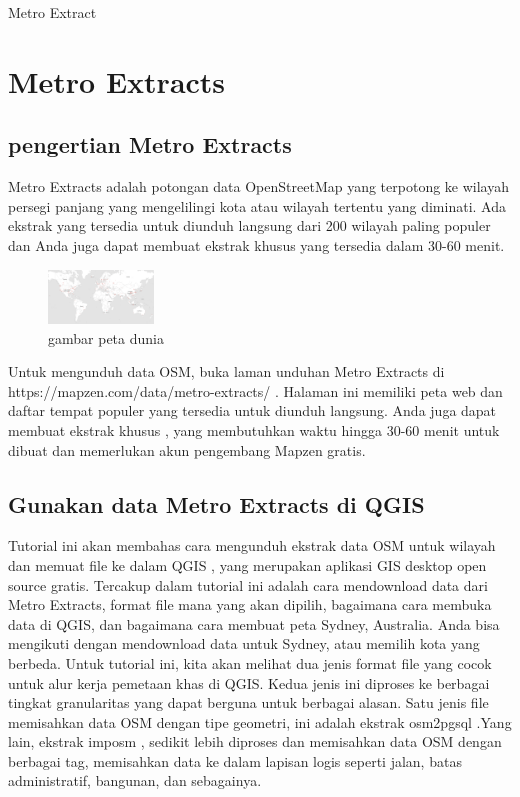 Metro Extract

\section{Metro Extracts}

\subsection{pengertian Metro Extracts}
Metro Extracts adalah potongan data OpenStreetMap yang terpotong ke wilayah persegi panjang yang mengelilingi kota atau wilayah tertentu yang diminati. Ada ekstrak yang tersedia untuk diunduh langsung dari 200 wilayah paling populer dan Anda juga dapat membuat ekstrak khusus yang tersedia dalam 30-60 menit.
\begin{figure}[ht]
\centerline{\includegraphics[width=0.25\textwidth]{figures/petadunia}}
\caption{gambar peta dunia}
\label {petadunia}
\end{figure}
Untuk mengunduh data OSM, buka laman unduhan Metro Extracts di https://mapzen.com/data/metro-extracts/ . Halaman ini memiliki peta web dan daftar tempat populer yang tersedia untuk diunduh langsung. Anda juga dapat membuat ekstrak khusus , yang membutuhkan waktu hingga 30-60 menit untuk dibuat dan memerlukan akun pengembang Mapzen gratis.
\subsection{Gunakan data Metro Extracts di QGIS}

Tutorial ini akan membahas cara mengunduh ekstrak data OSM untuk wilayah dan memuat file ke dalam QGIS , yang merupakan aplikasi GIS desktop open source gratis. Tercakup dalam tutorial ini adalah cara mendownload data dari Metro Extracts, format file mana yang akan dipilih, bagaimana cara membuka data di QGIS, dan bagaimana cara membuat peta Sydney, Australia. Anda bisa mengikuti dengan mendownload data untuk Sydney, atau memilih kota yang berbeda.
Untuk tutorial ini, kita akan melihat dua jenis format file yang cocok untuk alur kerja pemetaan khas di QGIS. Kedua jenis ini diproses ke berbagai tingkat granularitas yang dapat berguna untuk berbagai alasan. Satu jenis file memisahkan data OSM dengan tipe geometri, ini adalah ekstrak osm2pgsql .Yang lain, ekstrak imposm , sedikit lebih diproses dan memisahkan data OSM dengan berbagai tag, memisahkan data ke dalam lapisan logis seperti jalan, batas administratif, bangunan, dan sebagainya.
